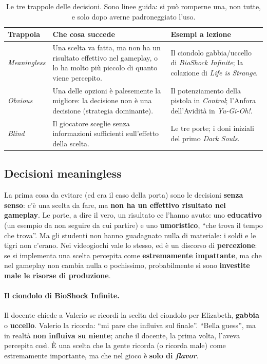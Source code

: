 \begin{table}[htbp]
  \centering
  \small
  \begin{tabular}{@{}p{}p{}p{}@{}}
    \toprule
    \textbf{Trappola} & \textbf{Che cosa succede} & \textbf{Esempi a lezione} \\
    \midrule
    \emph{Meaningless} & Una scelta va fatta, ma non ha un risultato
      effettivo nel gameplay, o lo ha molto più piccolo di quanto viene
      percepito. & Il ciondolo gabbia/uccello di \emph{BioShock Infinite};
      la colazione di \emph{Life is Strange}. \\
    \emph{Obvious} & Una delle opzioni è palesemente la migliore: la
      decisione non è una decisione (strategia dominante). & Il
      potenziamento della pistola in \emph{Control}; l'Anfora
      dell'Avidità in \emph{Yu-Gi-Oh!}. \\
    \emph{Blind} & Il giocatore sceglie senza informazioni sufficienti
      sull'effetto della scelta. & Le tre porte; i doni iniziali del primo
      \emph{Dark Souls}. \\
    \bottomrule
  \end{tabular}
  \caption{Le tre trappole delle decisioni. Sono linee guida: si può
  romperne una, non tutte, e solo dopo averne padroneggiato l'uso.}
  \label{gd15:tab:trappole}
\end{table}

\subsection{Decisioni meaningless}

La prima cosa da evitare (ed era il caso della porta) sono le decisioni
\textbf{senza senso}: c'è una scelta da fare, ma \textbf{non ha un effettivo
risultato nel gameplay}. Le porte, a dire il vero, un risultato ce l'hanno
avuto: uno \textbf{educativo} (un esempio da non seguire da cui partire) e
uno \textbf{umoristico}, ``che trova il tempo che trova''. Ma gli studenti non
hanno guadagnato nulla di materiale: i soldi e le tigri non c'erano. Nei
videogiochi vale lo stesso, ed è un discorso di \textbf{percezione}: se si
implementa una scelta percepita come \textbf{estremamente impattante}, ma
che nel gameplay non cambia nulla o pochissimo, probabilmente si sono
\textbf{investite male le risorse di produzione}.

\paragraph{Il ciondolo di BioShock Infinite.} Il docente chiede a Valerio se
ricordi la scelta del ciondolo per Elizabeth, \textbf{gabbia} o
\textbf{uccello}. Valerio la ricorda: ``mi pare che influiva sul finale''.
``Bella guess'', ma in realtà \textbf{non influiva su niente}; anche il
docente, la prima volta, l'aveva percepita così. È una scelta che la gente
ricorda (o ricorda male) come estremamente importante, ma che nel gioco è
\textbf{solo di \emph{flavor}}.

